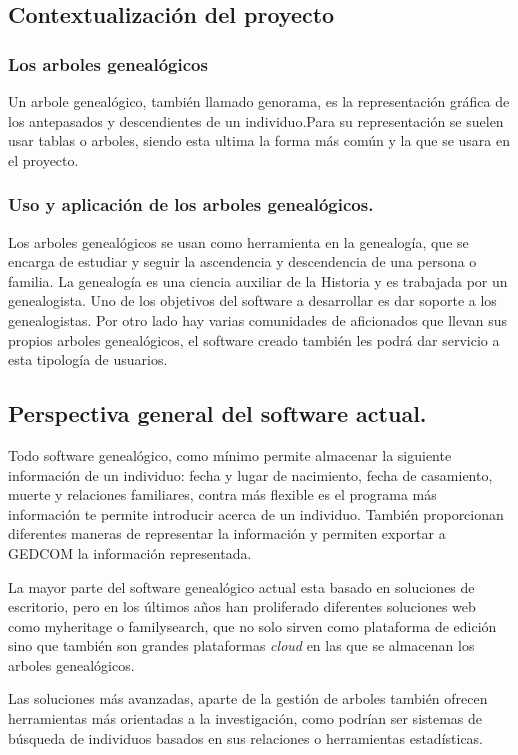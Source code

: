 \subsection{Contextualización del proyecto}

\subsubsection{Los arboles genealógicos}
Un arbole genealógico, también llamado genorama, es la representación gráfica de los antepasados  y descendientes de un individuo.Para su representación  se suelen usar tablas o arboles, siendo esta ultima la forma más común y la que se usara en el proyecto.

\subsubsection{Uso y aplicación de los arboles genealógicos.}
Los arboles genealógicos se usan como herramienta en la genealogía, que se encarga de estudiar y seguir la ascendencia y descendencia de una persona o familia. La genealogía es una ciencia auxiliar de la Historia y es trabajada por un genealogista. Uno de los objetivos del software a desarrollar es dar soporte a los genealogistas. \linebreak Por otro lado hay varias comunidades de aficionados que llevan sus propios arboles genealógicos, el software creado también les podrá dar servicio a esta tipología de usuarios.

\newpage
\subsection{Perspectiva general del software actual.}
Todo software genealógico, como mínimo permite almacenar la siguiente información de un individuo: fecha y lugar de nacimiento, fecha de casamiento, muerte y relaciones familiares, contra más flexible es el programa más información te permite introducir acerca de un individuo. También proporcionan diferentes maneras de representar la información y permiten exportar a GEDCOM la información representada.

\noindent{}

La mayor parte del software genealógico actual esta basado en soluciones de escritorio, pero en los últimos años han proliferado diferentes soluciones web como myheritage o familysearch, que no solo sirven como plataforma de edición sino que también son grandes plataformas \textit{cloud} en las que se almacenan los arboles genealógicos.

Las soluciones más avanzadas, aparte de la gestión de arboles también ofrecen herramientas más orientadas a la investigación, como podrían ser sistemas de búsqueda de individuos basados en sus relaciones o herramientas estadísticas.